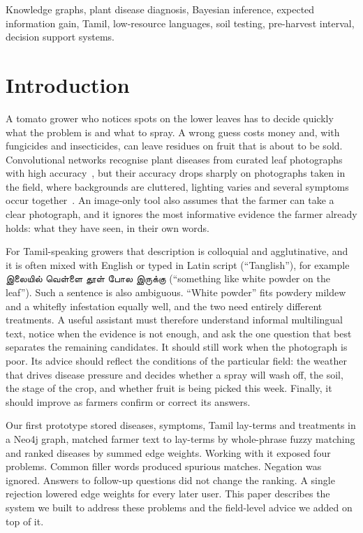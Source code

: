 \documentclass[conference]{IEEEtran}
\newcommand{\ta}[1]{{\tamilfont #1}}
\begin{document}
\begin{IEEEkeywords}
Knowledge graphs, plant disease diagnosis, Bayesian inference, expected information gain, Tamil, low-resource languages, soil testing, pre-harvest interval, decision support systems.
\end{IEEEkeywords}

\section{Introduction}

A tomato grower who notices spots on the lower leaves has to decide quickly what the problem is and what to spray. A wrong guess costs money and, with fungicides and insecticides, can leave residues on fruit that is about to be sold. Convolutional networks recognise plant diseases from curated leaf photographs with high accuracy~\cite{mohanty2016,ferentinos2018}, but their accuracy drops sharply on photographs taken in the field, where backgrounds are cluttered, lighting varies and several symptoms occur together~\cite{ferentinos2018,barbedo2018}. An image-only tool also assumes that the farmer can take a clear photograph, and it ignores the most informative evidence the farmer already holds: what they have seen, in their own words.

For Tamil-speaking growers that description is colloquial and agglutinative, and it is often mixed with English or typed in Latin script (``Tanglish''), for example \ta{இலையில் வெள்ளை தூள் போல இருக்கு} (``something like white powder on the leaf''). Such a sentence is also ambiguous. ``White powder'' fits powdery mildew and a whitefly infestation equally well, and the two need entirely different treatments. A useful assistant must therefore understand informal multilingual text, notice when the evidence is not enough, and ask the one question that best separates the remaining candidates. It should still work when the photograph is poor. Its advice should reflect the conditions of the particular field: the weather that drives disease pressure and decides whether a spray will wash off, the soil, the stage of the crop, and whether fruit is being picked this week. Finally, it should improve as farmers confirm or correct its answers.

Our first prototype stored diseases, symptoms, Tamil lay-terms and treatments in a Neo4j graph, matched farmer text to lay-terms by whole-phrase fuzzy matching and ranked diseases by summed edge weights. Working with it exposed four problems. Common filler words produced spurious matches. Negation was ignored. Answers to follow-up questions did not change the ranking. A single rejection lowered edge weights for every later user. This paper describes the system we built to address these problems and the field-level advice we added on top of it.
\end{document}
